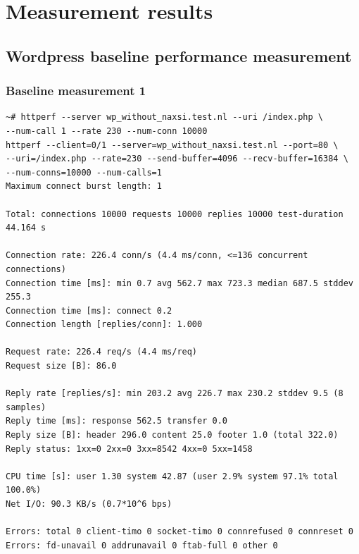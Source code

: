 \documentclass[Measurement results]{subfiles}
\begin{document}
\newpage
\section{Measurement results}
\label{sec:Measurement results}

\subsection{Wordpress baseline performance measurement }
\subsubsection{Baseline measurement 1}
\label{sec:baseline_measurement_1}
\begin{verbatim}
~# httperf --server wp_without_naxsi.test.nl --uri /index.php \
--num-call 1 --rate 230 --num-conn 10000
httperf --client=0/1 --server=wp_without_naxsi.test.nl --port=80 \
--uri=/index.php --rate=230 --send-buffer=4096 --recv-buffer=16384 \
--num-conns=10000 --num-calls=1
Maximum connect burst length: 1

Total: connections 10000 requests 10000 replies 10000 test-duration 44.164 s

Connection rate: 226.4 conn/s (4.4 ms/conn, <=136 concurrent connections)
Connection time [ms]: min 0.7 avg 562.7 max 723.3 median 687.5 stddev 255.3
Connection time [ms]: connect 0.2
Connection length [replies/conn]: 1.000

Request rate: 226.4 req/s (4.4 ms/req)
Request size [B]: 86.0

Reply rate [replies/s]: min 203.2 avg 226.7 max 230.2 stddev 9.5 (8 samples)
Reply time [ms]: response 562.5 transfer 0.0
Reply size [B]: header 296.0 content 25.0 footer 1.0 (total 322.0)
Reply status: 1xx=0 2xx=0 3xx=8542 4xx=0 5xx=1458

CPU time [s]: user 1.30 system 42.87 (user 2.9% system 97.1% total 100.0%)
Net I/O: 90.3 KB/s (0.7*10^6 bps)

Errors: total 0 client-timo 0 socket-timo 0 connrefused 0 connreset 0
Errors: fd-unavail 0 addrunavail 0 ftab-full 0 other 0
\end{verbatim}
\end{document}
